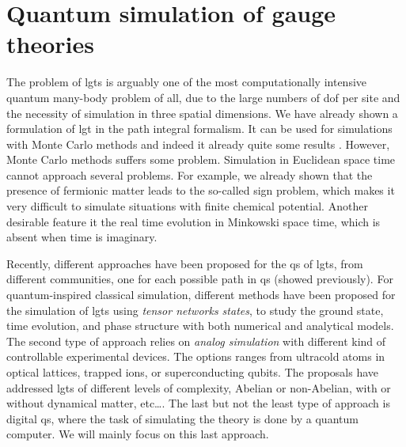 \section{Quantum simulation of gauge theories}
\label{sec:quantum_simulation_of_gauge_theories}


The problem of \ac{lgt}s is arguably one of the most computationally intensive quantum many-body problem of all, due to the large numbers of \ac{dof} per site and the necessity of simulation in three spatial dimensions.
We have already shown a formulation of \ac{lgt} in the path integral formalism.
It can be used for simulations with Monte Carlo methods and indeed it already quite some results \citneeded.
However, Monte Carlo methods suffers some problem.
Simulation in Euclidean space time cannot approach several problems.
For example, we already shown that the presence of fermionic matter leads to the so-called sign problem, which makes it very difficult to simulate situations with finite chemical potential.
Another desirable feature it the real time evolution in Minkowski space time, which is absent when time is imaginary.

Recently, different approaches have been proposed for the \ac{qs} of \ac{lgt}s, from different communities, one for each possible path in \ac{qs} (showed previously).
For quantum-inspired classical simulation, different methods have been proposed for the simulation of \ac{lgt}s using \emph{tensor networks states}, to study the ground state, time evolution, and phase structure with both numerical and analytical models.
The second type of approach relies on \emph{analog simulation} with different kind of controllable experimental devices.
The options ranges from ultracold atoms in optical lattices\citneeded, trapped ions\citneeded, or superconducting qubits\citneeded.
The proposals have addressed \ac{lgt}s of different levels of complexity, Abelian or non-Abelian, with or without dynamical matter, etc\dots.
The last but not the least type of approach is digital \ac{qs}, where the task of simulating the theory is done by a quantum computer.
We will mainly focus on this last approach.

